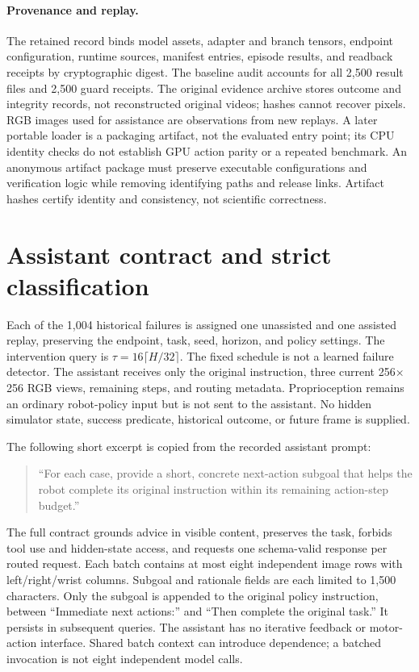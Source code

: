 \paragraph{Provenance and replay.}
The retained record binds model assets, adapter and branch tensors, endpoint configuration, runtime sources, manifest entries, episode results, and readback receipts by cryptographic digest. The baseline audit accounts for all 2,500 result files and 2,500 guard receipts. The original evidence archive stores outcome and integrity records, not reconstructed original videos; hashes cannot recover pixels. RGB images used for assistance are observations from new replays. A later portable loader is a packaging artifact, not the evaluated entry point; its CPU identity checks do not establish GPU action parity or a repeated benchmark. An anonymous artifact package must preserve executable configurations and verification logic while removing identifying paths and release links. Artifact hashes certify identity and consistency, not scientific correctness.

\section{Assistant contract and strict classification}
\label{s:eligibility}
Each of the 1,004 historical failures is assigned one unassisted and one assisted replay, preserving the endpoint, task, seed, horizon, and policy settings. The intervention query is $\tau=16\lceil H/32\rceil$. The fixed schedule is not a learned failure detector. The assistant receives only the original instruction, three current 256$\times$256 RGB views, remaining steps, and routing metadata. Proprioception remains an ordinary robot-policy input but is not sent to the assistant. No hidden simulator state, success predicate, historical outcome, or future frame is supplied.

The following short excerpt is copied from the recorded assistant prompt:
\begin{quote}\small
``For each case, provide a short, concrete next-action subgoal that helps the robot complete its original instruction within its remaining action-step budget.''
\end{quote}
The full contract grounds advice in visible content, preserves the task, forbids tool use and hidden-state access, and requests one schema-valid response per routed request. Each batch contains at most eight independent image rows with left/right/wrist columns. Subgoal and rationale fields are each limited to 1,500 characters. Only the subgoal is appended to the original policy instruction, between ``Immediate next actions:'' and ``Then complete the original task.'' It persists in subsequent queries. The assistant has no iterative feedback or motor-action interface. Shared batch context can introduce dependence; a batched invocation is not eight independent model calls.

